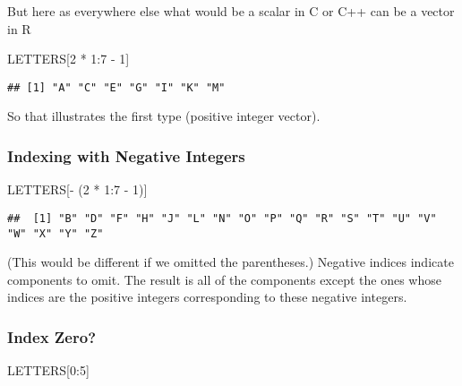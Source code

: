 \documentclass[
]{article}
\newenvironment{Shaded}{\begin{snugshade}}{\end{snugshade}}
\newcommand{\DecValTok}[1]{\textcolor[rgb]{0.00,0.00,0.81}{#1}}
\newcommand{\NormalTok}[1]{#1}
\newcommand{\SpecialCharTok}[1]{\textcolor[rgb]{0.00,0.00,0.00}{#1}}
\begin{document}
But here as everywhere else what would be a scalar in C or C++ can be a
vector in R

\begin{Shaded}
\begin{Highlighting}[]
\NormalTok{LETTERS[}\DecValTok{2} \SpecialCharTok{*} \DecValTok{1}\SpecialCharTok{:}\DecValTok{7} \SpecialCharTok{{-}} \DecValTok{1}\NormalTok{]}
\end{Highlighting}
\end{Shaded}

\begin{verbatim}
## [1] "A" "C" "E" "G" "I" "K" "M"
\end{verbatim}

So that illustrates the first type (positive integer vector).

\hypertarget{indexing-with-negative-integers}{%
\subsubsection{Indexing with Negative
Integers}\label{indexing-with-negative-integers}}

\begin{Shaded}
\begin{Highlighting}[]
\NormalTok{LETTERS[}\SpecialCharTok{{-}}\NormalTok{ (}\DecValTok{2} \SpecialCharTok{*} \DecValTok{1}\SpecialCharTok{:}\DecValTok{7} \SpecialCharTok{{-}} \DecValTok{1}\NormalTok{)]}
\end{Highlighting}
\end{Shaded}

\begin{verbatim}
##  [1] "B" "D" "F" "H" "J" "L" "N" "O" "P" "Q" "R" "S" "T" "U" "V" "W" "X" "Y" "Z"
\end{verbatim}

(This would be different if we omitted the parentheses.) Negative
indices indicate components to omit. The result is all of the components
except the ones whose indices are the positive integers corresponding to
these negative integers.

\hypertarget{index-zero}{%
\subsubsection{Index Zero?}\label{index-zero}}

\begin{Shaded}
\begin{Highlighting}[]
\NormalTok{LETTERS[}\DecValTok{0}\SpecialCharTok{:}\DecValTok{5}\NormalTok{]}
\end{Highlighting}
\end{Shaded}
\end{document}
